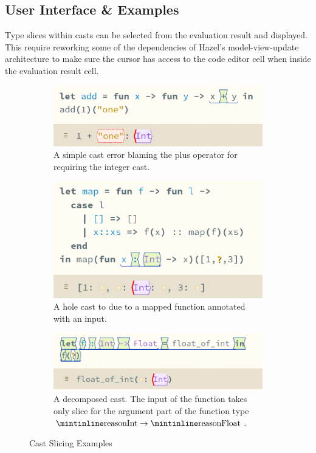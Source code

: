 \subsection{User Interface \& Examples}
Type slices within casts can be selected from the evaluation result and displayed. This require reworking some of the dependencies of Hazel's model-view-update architecture to make sure the cursor has access to the code editor cell when inside the evaluation result cell.
\begin{figure}[h]
\centering
\begin{subfigure}{0.45\textwidth}
\centering
\includegraphics[width=1\textwidth]{Media/Figures/simple_cast_error}
\caption{A simple cast error blaming the plus operator for requiring the integer cast.}
\end{subfigure}
\begin{subfigure}{0.45\textwidth}
\centering
\includegraphics[width=1\textwidth]{Media/Figures/map_cast}
\caption{A hole cast to  due to a mapped function annotated with an  input.}
\end{subfigure}
\begin{subfigure}{0.65\textwidth}
\centering
\includegraphics[width=1\textwidth]{Media/Figures/decompose_casts}
\caption{A decomposed cast. The input of the function takes only slice for the argument part  of the function type $\code{Int} \to \code{Float}$.}
\end{subfigure}
\caption{Cast Slicing Examples}
\end{figure}
